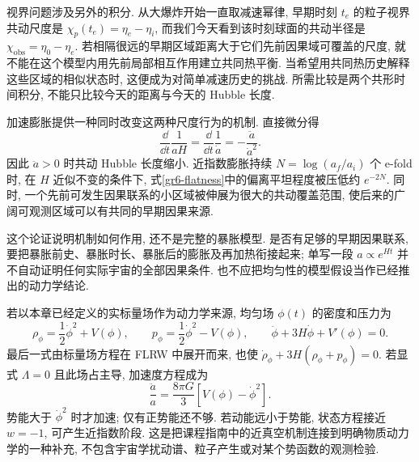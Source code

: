 视界问题涉及另外的积分. 从大爆炸开始一直取减速幂律, 早期时刻 $t_e$ 的粒子视界共动尺度是 $\chi_p(t_e)=\eta_e-\eta_i$, 而我们今天看到该时刻球面的共动半径是 $\chi_{\mathrm{obs}}=\eta_0-\eta_e$. 若相隔很远的早期区域距离大于它们先前因果域可覆盖的尺度, 就不能在这个模型内用先前局部相互作用建立共同热平衡. 当希望用共同热历史解释这些区域的相似状态时, 这便成为对简单减速历史的挑战. 所需比较是两个共形时间积分, 不能只比较今天的距离与今天的 Hubble 长度.

加速膨胀提供一种同时改变这两种尺度行为的机制. 直接微分得
\[
 \frac{\dd}{\dd t}\frac1{aH}=\frac{\dd}{\dd t}\frac1{\dot a}
                         =-\frac{\ddot a}{\dot a^2}.
\]
因此 $\ddot a>0$ 时共动 Hubble 长度缩小. 近指数膨胀持续 $N=\log(a_f/a_i)$ 个 e-fold 时, 在 $H$ 近似不变的条件下, 式\eqref{gr6-flatness}中的偏离平坦程度被压低约 $e^{-2N}$. 同时, 一个先前可发生因果联系的小区域被伸展为很大的共动覆盖范围, 使后来的广阔可观测区域可以有共同的早期因果来源.

这个论证说明机制如何作用, 还不是完整的暴胀模型. 是否有足够的早期因果联系, 要把暴胀前史、暴胀时长、暴胀后的膨胀及再加热衔接起来; 单写一段 $a\propto e^{Ht}$ 并不自动证明任何实际宇宙的全部因果条件. 也不应把均匀性的模型假设当作已经推出的动力学结论.

若以本章已经定义的实标量场作为动力学来源, 均匀场 $\phi(t)$ 的密度和压力为
\[
 \rho_\phi=\frac12\dot\phi^2+V(\phi),\qquad
 p_\phi=\frac12\dot\phi^2-V(\phi),
 \qquad \ddot\phi+3H\dot\phi+V'(\phi)=0.
\]
最后一式由标量场方程在 FLRW 中展开而来, 也使 $\dot\rho_\phi+3H(\rho_\phi+p_\phi)=0$. 若显式 $\Lambda=0$ 且此场占主导, 加速度方程成为
\[
 \frac{\ddot a}{a}=\frac{8\pi G}{3}[V(\phi)-\dot\phi^2].
\]
势能大于 $\dot\phi^2$ 时才加速; 仅有正势能还不够. 若动能远小于势能, 状态方程接近 $w=-1$, 可产生近指数阶段. 这是把课程指南中的近真空机制连接到明确物质动力学的一种补充, 不包含宇宙学扰动谱、粒子产生或对某个势函数的观测检验.
